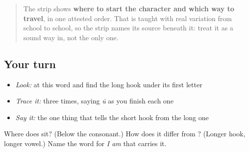 \begin{quote}
The strip shows \textbf{where to start the character and which way to travel}, in one attested order. That is taught with real variation from school to school, so the strip names its source beneath it: treat it as a sound way in, not the only one.
\end{quote}

\subsection*{Your turn}
\begin{itemize}
\raggedright
  \item \emph{Look:} at this word and find the long hook under its first letter
\end{itemize}

\begin{quote}
\end{quote}

\begin{itemize}
\raggedright
  \item \emph{Trace it:}  three times, saying \emph{ū} as you finish each one
  \item \emph{Say it:} the one thing that tells the short hook from the long one
\end{itemize}

\begin{tcolorbox}[breakable,colback=teal!4,colframe=teal!35!black,title={Before you move on}]
Where does \textbf{} sit? (Below the consonant.) How does it differ from \textbf{}? (Longer hook, longer vowel.) Name the word for \emph{I am} that carries it.
\end{tcolorbox}
